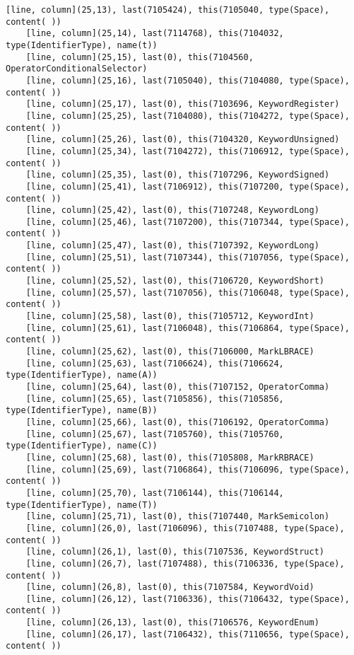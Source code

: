 \documentclass[UTF8]{ctexart}
\begin{document}
{\begin{lstlisting}[language={[ANSI]C++}]
    [line, column](25,13), last(7105424), this(7105040, type(Space), content( ))
    [line, column](25,14), last(7114768), this(7104032, type(IdentifierType), name(t))
    [line, column](25,15), last(0), this(7104560, OperatorConditionalSelector)
    [line, column](25,16), last(7105040), this(7104080, type(Space), content( ))
    [line, column](25,17), last(0), this(7103696, KeywordRegister)
    [line, column](25,25), last(7104080), this(7104272, type(Space), content( ))
    [line, column](25,26), last(0), this(7104320, KeywordUnsigned)
    [line, column](25,34), last(7104272), this(7106912, type(Space), content( ))
    [line, column](25,35), last(0), this(7107296, KeywordSigned)
    [line, column](25,41), last(7106912), this(7107200, type(Space), content( ))
    [line, column](25,42), last(0), this(7107248, KeywordLong)
    [line, column](25,46), last(7107200), this(7107344, type(Space), content( ))
    [line, column](25,47), last(0), this(7107392, KeywordLong)
    [line, column](25,51), last(7107344), this(7107056, type(Space), content( ))
    [line, column](25,52), last(0), this(7106720, KeywordShort)
    [line, column](25,57), last(7107056), this(7106048, type(Space), content( ))
    [line, column](25,58), last(0), this(7105712, KeywordInt)
    [line, column](25,61), last(7106048), this(7106864, type(Space), content( ))
    [line, column](25,62), last(0), this(7106000, MarkLBRACE)
    [line, column](25,63), last(7106624), this(7106624, type(IdentifierType), name(A))
    [line, column](25,64), last(0), this(7107152, OperatorComma)
    [line, column](25,65), last(7105856), this(7105856, type(IdentifierType), name(B))
    [line, column](25,66), last(0), this(7106192, OperatorComma)
    [line, column](25,67), last(7105760), this(7105760, type(IdentifierType), name(C))
    [line, column](25,68), last(0), this(7105808, MarkRBRACE)
    [line, column](25,69), last(7106864), this(7106096, type(Space), content( ))
    [line, column](25,70), last(7106144), this(7106144, type(IdentifierType), name(T))
    [line, column](25,71), last(0), this(7107440, MarkSemicolon)
    [line, column](26,0), last(7106096), this(7107488, type(Space), content( ))
    [line, column](26,1), last(0), this(7107536, KeywordStruct)
    [line, column](26,7), last(7107488), this(7106336, type(Space), content( ))
    [line, column](26,8), last(0), this(7107584, KeywordVoid)
    [line, column](26,12), last(7106336), this(7106432, type(Space), content( ))
    [line, column](26,13), last(0), this(7106576, KeywordEnum)
    [line, column](26,17), last(7106432), this(7110656, type(Space), content( ))

\end{lstlisting}}
\end{document}
